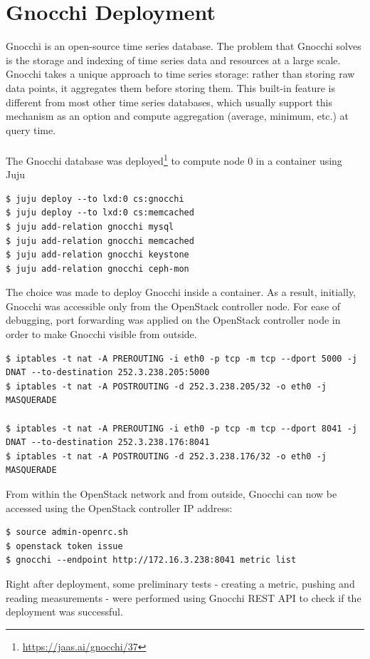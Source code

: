 \documentclass[11pt,a4paper]{article}
\begin{document}
\section{Gnocchi Deployment}
Gnocchi is an open-source time series database. The problem that Gnocchi solves is the storage and indexing of time series data and resources at a large scale. Gnocchi takes a unique approach to time series storage: rather than storing raw data points, it aggregates them before storing them. This built-in feature is different from most other time series databases, which usually support this mechanism as an option and compute aggregation (average, minimum, etc.) at query time.\\
\\
The Gnocchi database was deployed\footnote{\url{https://jaas.ai/gnocchi/37}} to compute node 0 in a container using Juju
\begin{lstlisting}[]
$ juju deploy --to lxd:0 cs:gnocchi
$ juju deploy --to lxd:0 cs:memcached
$ juju add-relation gnocchi mysql
$ juju add-relation gnocchi memcached
$ juju add-relation gnocchi keystone
$ juju add-relation gnocchi ceph-mon
\end{lstlisting}
The choice was made to deploy Gnocchi inside a container. As a result, initially, Gnocchi was accessible only from the OpenStack controller node. For ease of debugging, port forwarding was applied on the OpenStack controller node in order to make Gnocchi visible from outside.
\begin{lstlisting}[]
$ iptables -t nat -A PREROUTING -i eth0 -p tcp -m tcp --dport 5000 -j DNAT --to-destination 252.3.238.205:5000
$ iptables -t nat -A POSTROUTING -d 252.3.238.205/32 -o eth0 -j MASQUERADE

$ iptables -t nat -A PREROUTING -i eth0 -p tcp -m tcp --dport 8041 -j DNAT --to-destination 252.3.238.176:8041
$ iptables -t nat -A POSTROUTING -d 252.3.238.176/32 -o eth0 -j MASQUERADE
\end{lstlisting}
From within the OpenStack network and from outside, Gnocchi can now be accessed using the OpenStack controller IP address:
\begin{lstlisting}[]
$ source admin-openrc.sh
$ openstack token issue
$ gnocchi --endpoint http://172.16.3.238:8041 metric list
\end{lstlisting}
Right after deployment, some preliminary tests - creating a metric, pushing and reading measurements - were performed using Gnocchi REST API to check if the deployment was successful.
\end{document}
